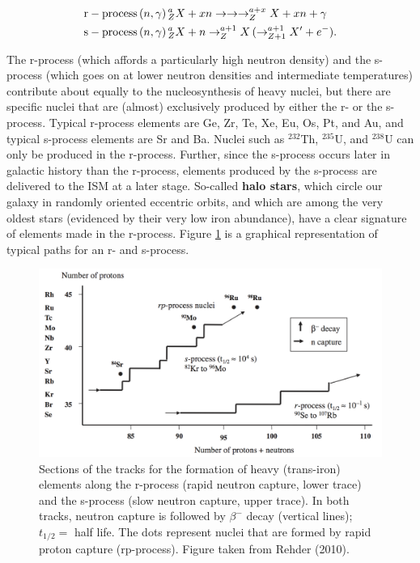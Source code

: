 \documentclass[a4paper,10pt]{article}
\begin{document}
\begin{align*}
    {\rm r-process}\,(n,\gamma)\,&^a_ZX+xn \rightarrow\rightarrow\rightarrow ^{a+x}_ZX+xn + \gamma \\
    {\rm s-process}\,(n,\gamma)\,&^a_ZX+n \rightarrow ^{a+1}_ZX\,(\rightarrow^{a+1}_{Z+1}X'+e^-).
\end{align*}

{\noindent}The r-process (which affords a particularly high neutron density) and the s-process (which goes on at lower neutron densities and intermediate temperatures) contribute about equally to the nucleosynthesis of heavy nuclei, but there are specific nuclei that are (almost) exclusively produced by either the r- or the s-process. Typical r-process elements are Ge, Zr, Te, Xe, Eu, Os, Pt, and Au, and typical s-process elements are Sr and Ba. Nuclei such as $^{232}$Th, $^{235}$U, and $^{238}$U can only be produced in the r-process. Further, since the s-process occurs later in galactic history than the r-process, elements produced by the s-process are delivered to the ISM at a later stage. So-called \textbf{halo stars}, which circle our galaxy in randomly oriented eccentric orbits, and which are among the very oldest stars (evidenced by their very low iron abundance), have a clear signature of elements made in the r-process. Figure \ref{fig:rsprocesses} is a graphical representation of typical paths for an r- and s-process.

\begin{figure}[t]
    \centering
    \includegraphics[width=14cm]{figures/rs-processes.png}
    \caption{\footnotesize{Sections of the tracks for the formation of heavy (trans-iron) elements along the r-process (rapid neutron capture, lower trace) and the s-process (slow neutron capture, upper trace). In both tracks, neutron capture is followed by $\beta^-$ decay (vertical lines); $t_{1/2}=$ half life. The dots represent nuclei that are formed by rapid proton capture (rp-process). Figure taken from Rehder (2010).}}
    \label{fig:rsprocesses}
\end{figure}
\end{document}
